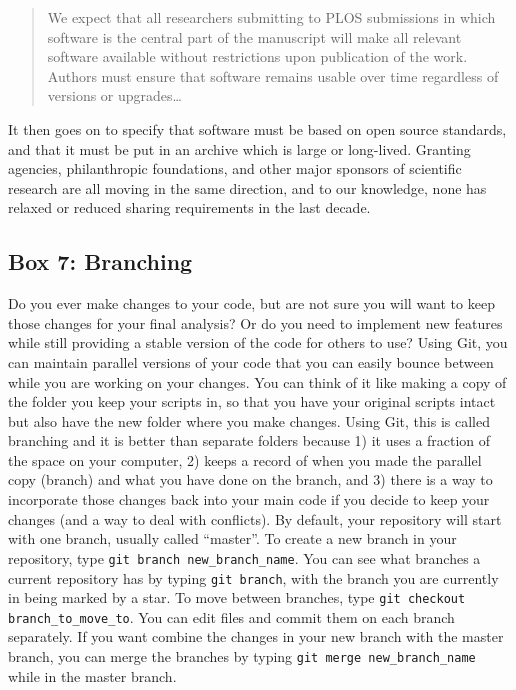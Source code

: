 \documentclass[10pt]{article}
\begin{document}
\begin{quote}
We expect that all researchers submitting to PLOS submissions in which software is the central part of the manuscript will make all relevant software available without restrictions upon publication of the work. Authors must ensure that software remains usable over time regardless of versions or upgrades\ldots
\end{quote}

It then goes on to specify that software must be based on open source standards,
and that it must be put in an archive which is large or long-lived.
Granting agencies, philanthropic foundations, and other major sponsors of scientific research are all moving in the same direction,
and to our knowledge,
none has relaxed or reduced sharing requirements in the last decade.


\subsection{Box 7: Branching}

Do you ever make changes to your code, but are not sure you will want to keep those changes for your final analysis? Or do you need to implement new features while still providing a stable version of the code for others to use? Using Git, you can maintain parallel versions of your code that you can easily bounce between while you are working on your changes. You can think of it like making a copy of the folder you keep your scripts in, so that you have your original scripts intact but also have the new folder where you make changes. Using Git, this is called branching and it is better than separate folders because 1) it uses a fraction of the space on your computer, 2) keeps a record of when you made the parallel copy (branch) and what you have done on the branch, and 3) there is a way to incorporate those changes back into your main code if you decide to keep your changes (and a way to deal with conflicts). By default, your repository will start with one branch, usually called ``master''. To create a new branch in your repository, type \verb|git branch new_branch_name|. You can see what branches a current repository has by typing \verb|git branch|, with the branch you are currently in being marked by a star. To move between branches, type \verb|git checkout branch_to_move_to|. You can edit files and commit them on each branch separately. If you want combine the changes in your new branch with the master branch, you can merge the branches by typing \verb|git merge new_branch_name| while in the master branch.
\end{document}
